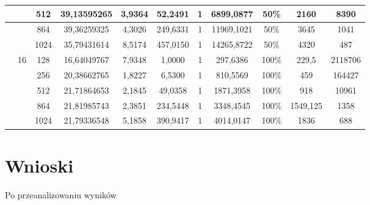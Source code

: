 \documentclass[10pt,a4paper]{article}
\begin{document}
\begin{center}
\begin{tabular}{ |c|c|c|c|c|c|c|c|c|c|c| }
		      &    & 512  & 39,13595265 & 3,9364  & 52,2491   & 1      & 6899,0877  & 50\%  & 2160     & 8390    \\ \hline
		      &    & 864  & 39,36259325 & 4,3026  & 249,6331  & 1      & 11969,1021 & 50\%  & 3645     & 1041    \\ \hline
		      &    & 1024 & 35,79431614 & 8,5174  & 457,0150  & 1      & 14265,8722 & 50\%  & 4320     & 487     \\ \hline
		      & 16 & 128  & 16,64049767 & 7,9348  & 1,0000    & 1      & 297,6386   & 100\% & 229,5    & 2118706 \\ \hline
		      &    & 256  & 20,38662765 & 1,8227  & 6,5300    & 1      & 810,5569   & 100\% & 459      & 164427  \\ \hline
		      &    & 512  & 21,71864653 & 2,1845  & 49,0358   & 1      & 1871,3958  & 100\% & 918      & 10961   \\ \hline
		      &    & 864  & 21,81985743 & 2,3851  & 234,5448  & 1      & 3348,4545  & 100\% & 1549,125 & 1358    \\ \hline
		      &    & 1024 & 21,79336548 & 5,1858  & 390,9417  & 1      & 4014,0147  & 100\% & 1836     & 688     \\ \hline
	\end{tabular}
\end{center}

\section{Wnioski}
Po przeanalizowaniu wyników
\end{document}
